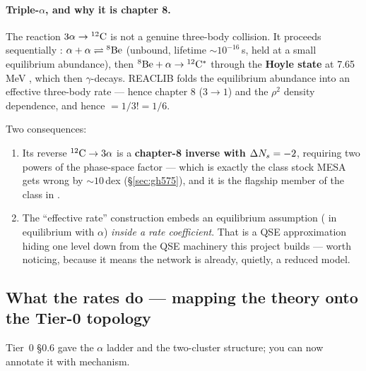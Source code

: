 \paragraph{Triple-\texorpdfstring{$\alpha$}{alpha}, and why it is chapter 8.}
The reaction $3\alpha \to \nuc{C}{12}$ is not a genuine three-body collision. It
proceeds sequentially \citep{salpeter1952,jose2011}: $\alpha + \alpha
\rightleftharpoons \nuc{Be}{8}$ (unbound, lifetime ${\sim}10^{-16}$\,s, held at
a small equilibrium abundance), then $\nuc{Be}{8} + \alpha \to \nuc{C}{12}^*$
through the \textbf{Hoyle state} at 7.65\,MeV \citep{freer2014}, which then
$\gamma$-decays. REACLIB folds the  equilibrium abundance into an
effective three-body rate --- hence chapter 8 ($3 \to 1$) and the $\rho^2$
density dependence, and hence  $= 1/3! = 1/6$.

Two consequences:

\begin{enumerate}
\item Its reverse $\nuc{C}{12} \to 3\alpha$ is a \textbf{chapter-8 inverse with
      $\dNs = -2$}, requiring two powers of the phase-space factor --- which is
      exactly the class stock MESA gets wrong by ${\sim}10$\,dex
      (\S\ref{sec:gh575}), and it is the flagship member of the
       class in
      .
\item The ``effective rate'' construction embeds an equilibrium assumption
      ( in equilibrium with $\alpha$) \emph{inside a rate
      coefficient}. That is a QSE approximation hiding one level down from the
      QSE machinery this project builds --- worth noticing, because it means the
      network is already, quietly, a reduced model.
\end{enumerate}

\subsection{What the rates do --- mapping the theory onto the Tier-0 topology}
\label{sec:whatratesdo}

Tier~0 \S0.6 gave the $\alpha$ ladder and the two-cluster structure; you can now
annotate it with mechanism.

